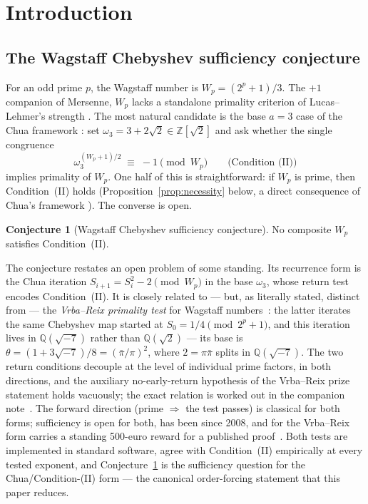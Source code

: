\documentclass[11pt]{amsart}
\theoremstyle{plain}
\theoremstyle{definition}
\newtheorem{conjecture}[theorem]{Conjecture}
\theoremstyle{remark}
\numberwithin{equation}{section}
\newcommand{\Z}{\mathbb{Z}}
\newcommand{\Q}{\mathbb{Q}}
\begin{document}
\maketitle

\section{Introduction}

\subsection{The Wagstaff Chebyshev sufficiency conjecture}

For an odd prime $p$, the Wagstaff number is $W_p = (2^p + 1)/3$. The $+1$ companion of Mersenne, $W_p$ lacks a standalone primality criterion of Lucas--Lehmer's strength \cite{ref:Williams}. The most natural candidate is the base $a = 3$ case of the Chua framework \cite{ref:Chua}: set $\omega_3 = 3 + 2\sqrt{2} \in \Z[\sqrt 2]$ and ask whether the single congruence
\[
  \omega_3^{(W_p + 1)/2} \;\equiv\; -1 \pmod{W_p} \qquad \text{(Condition (II))}
\]
implies primality of $W_p$. One half of this is straightforward: if $W_p$ is prime, then Condition~(II) holds (Proposition~\ref{prop:necessity} below, a direct consequence of Chua's framework \cite{ref:Chua}). The converse is open.

\begin{conjecture}[Wagstaff Chebyshev sufficiency conjecture]\label{conj:suff}
No composite $W_p$ satisfies Condition~(II).
\end{conjecture}

The conjecture restates an open problem of some standing. Its recurrence form is the Chua iteration $S_{i+1} = S_i^2 - 2 \pmod{W_p}$ in the base $\omega_3$, whose return test encodes Condition~(II). It is closely related to --- but, as literally stated, distinct from --- the \emph{Vrba--Reix primality test} for Wagstaff numbers~\cite{ref:VrbaReix}: the latter iterates the same Chebyshev map started at $S_0 = 1/4 \pmod{2^p + 1}$, and this iteration lives in $\Q(\sqrt{-7})$ rather than $\Q(\sqrt 2)$ --- its base is $\theta = (1 + 3\sqrt{-7})/8 = (\bar\pi/\pi)^2$, where $2 = \pi\bar\pi$ splits in $\Q(\sqrt{-7})$. The two return conditions decouple at the level of individual prime factors, in both directions, and the auxiliary no-early-return hypothesis of the Vrba--Reix prize statement holds vacuously; the exact relation is worked out in the companion note~\cite{ref:VRNote}. The forward direction (prime $\Rightarrow$ the test passes) is classical for both forms; sufficiency is open for both, has been since 2008, and for the Vrba--Reix form carries a standing 500-euro reward for a published proof~\cite{ref:VrbaReix}. Both tests are implemented in standard software, agree with Condition~(II) empirically at every tested exponent, and Conjecture~\ref{conj:suff} is the sufficiency question for the Chua/Condition-(II) form --- the canonical order-forcing statement that this paper reduces.
\end{document}

